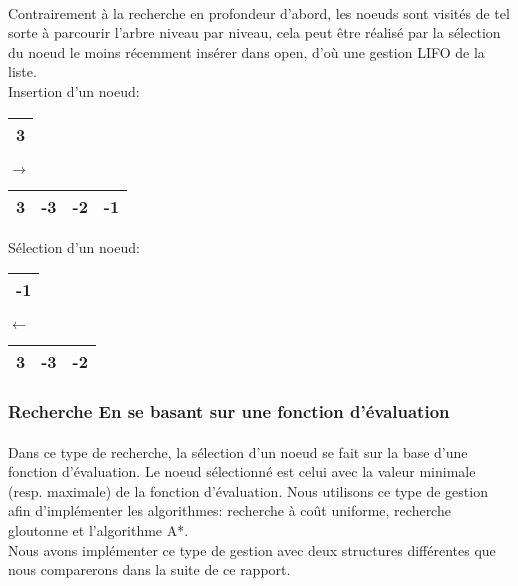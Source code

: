 \paragraph{}
Contrairement à la recherche en profondeur d’abord, les noeuds sont visités de tel sorte à parcourir l’arbre niveau par niveau, cela peut être réalisé par la sélection du noeud le moins récemment insérer dans open, d’où une gestion LIFO de la liste.\\
Insertion d'un noeud:\\
\begin{minipage}{0.5\textwidth}
	\centering
	\begin{tabular}{|c |}
		\hline
		3 \\
		\hline
	\end{tabular}
\end{minipage}
\hfillx
$\rightarrow$
\begin{minipage}{0.5\textwidth}
	\centering
	\begin{tabular}{|c | c| c| c|}
		\hline
		{\color{red}3} & -3 & -2 & -1 \\\hline
	\end{tabular}
\end{minipage}

Sélection d'un noeud:\\
\begin{minipage}{0.5\textwidth}
	\centering
	\begin{tabular}{|c |}
		\hline
		{\color{red}-1} \\
		\hline
	\end{tabular}
\end{minipage}
\hfillx
$\leftarrow$
\begin{minipage}{0.5\textwidth}
	\centering
	\begin{tabular}{| c| c| c|}
		\hline
		3 & -3 & -2  \\\hline
	\end{tabular}
\end{minipage}

\subsubsection{Recherche En se basant sur une fonction d'évaluation}
\paragraph{}
Dans ce type de recherche, la sélection d’un noeud se fait sur la base d’une fonction d’évaluation. Le noeud sélectionné est celui avec la valeur minimale (resp. maximale) de la fonction d’évaluation. Nous utilisons ce type de gestion afin d’implémenter les algorithmes: recherche à coût uniforme, recherche gloutonne et l’algorithme A*.\\
Nous avons implémenter ce type de gestion avec deux structures différentes que nous comparerons dans la suite de ce rapport.
